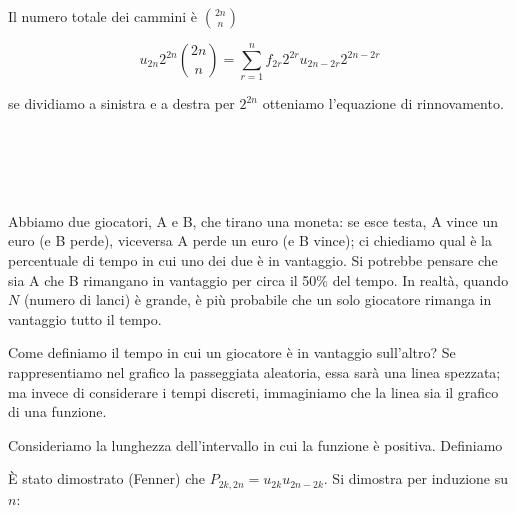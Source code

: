 \documentclass[a4paper,12pt]{book}
\begin{document}
Il numero totale dei cammini è $ \binom{2n}{n} $

$$ u_{2n} 2^{2n} \binom{2n}{n} = \sum_{r=1}^{n} f_{2r}2^{2r} u_{2n-2r}2^{2n-2r} $$

se dividiamo a sinistra e a destra per $ 2^{2n} $ otteniamo l'equazione di rinnovamento.
\\
\\
\\
\\
\\
\\
Abbiamo due giocatori, A e B, che tirano una moneta: se esce testa, A vince un euro (e B perde), viceversa A perde un euro (e B vince); ci chiediamo qual è la percentuale di tempo in cui uno dei due è in vantaggio. Si potrebbe pensare che sia A che B rimangano in vantaggio per circa il 50\% del tempo. In realtà, quando $ N $ (numero di lanci) è grande, è più probabile che un solo giocatore rimanga in vantaggio tutto il tempo. 

\begin{multicols}{2}
	
	
	Come definiamo il tempo in cui un giocatore è in vantaggio sull'altro? Se rappresentiamo nel grafico la passeggiata aleatoria, essa sarà una linea spezzata; ma invece di considerare i tempi discreti, immaginiamo che la linea sia il grafico di una funzione.
\end{multicols}

Consideriamo la lunghezza dell'intervallo in cui la funzione è positiva. Definiamo 


È stato dimostrato (Fenner) che $ P_{2k, 2n} = u_{2k}u_{2n-2k} $. Si dimostra per induzione su $ n $:
\end{document}
